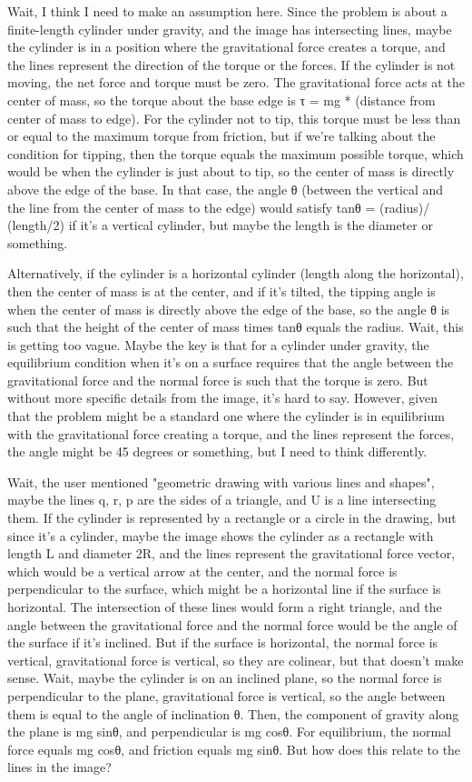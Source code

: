 Wait, I think I need to make an assumption here. Since the problem is about a finite-length cylinder under gravity, and the image has intersecting lines, maybe the cylinder is in a position where the gravitational force creates a torque, and the lines represent the direction of the torque or the forces. If the cylinder is not moving, the net force and torque must be zero. The gravitational force acts at the center of mass, so the torque about the base edge is τ = mg * (distance from center of mass to edge). For the cylinder not to tip, this torque must be less than or equal to the maximum torque from friction, but if we're talking about the condition for tipping, then the torque equals the maximum possible torque, which would be when the cylinder is just about to tip, so the center of mass is directly above the edge of the base. In that case, the angle θ (between the vertical and the line from the center of mass to the edge) would satisfy tanθ = (radius)/ (length/2) if it's a vertical cylinder, but maybe the length is the diameter or something.

Alternatively, if the cylinder is a horizontal cylinder (length along the horizontal), then the center of mass is at the center, and if it's tilted, the tipping angle is when the center of mass is directly above the edge of the base, so the angle θ is such that the height of the center of mass times tanθ equals the radius. Wait, this is getting too vague. Maybe the key is that for a cylinder under gravity, the equilibrium condition when it's on a surface requires that the angle between the gravitational force and the normal force is such that the torque is zero. But without more specific details from the image, it's hard to say. However, given that the problem might be a standard one where the cylinder is in equilibrium with the gravitational force creating a torque, and the lines represent the forces, the angle might be 45 degrees or something, but I need to think differently.

Wait, the user mentioned "geometric drawing with various lines and shapes", maybe the lines q, r, p are the sides of a triangle, and U is a line intersecting them. If the cylinder is represented by a rectangle or a circle in the drawing, but since it's a cylinder, maybe the image shows the cylinder as a rectangle with length L and diameter 2R, and the lines represent the gravitational force vector, which would be a vertical arrow at the center, and the normal force is perpendicular to the surface, which might be a horizontal line if the surface is horizontal. The intersection of these lines would form a right triangle, and the angle between the gravitational force and the normal force would be the angle of the surface if it's inclined. But if the surface is horizontal, the normal force is vertical, gravitational force is vertical, so they are colinear, but that doesn't make sense. Wait, maybe the cylinder is on an inclined plane, so the normal force is perpendicular to the plane, gravitational force is vertical, so the angle between them is equal to the angle of inclination θ. Then, the component of gravity along the plane is mg sinθ, and perpendicular is mg cosθ. For equilibrium, the normal force equals mg cosθ, and friction equals mg sinθ. But how does this relate to the lines in the image?

